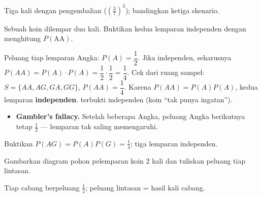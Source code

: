 \begin{variasi}
Tiga kali dengan pengembalian ($(\frac37)^3$); bandingkan ketiga skenario.
\end{variasi}

\begin{soalbox}{}
Sebuah koin dilempar dua kali. Buktikan kedua lemparan independen dengan
menghitung $P(\text{AA})$.
\end{soalbox}

\jawab
{} Peluang tiap lemparan Angka: $P(A)=\dfrac12$.
 Jika independen, seharusnya $P(AA)=P(A)\cdot P(A)=\dfrac12\cdot
\dfrac12=\dfrac14$.
 Cek dari ruang sampel: $S=\{AA,AG,GA,GG\}$, $P(AA)=\dfrac14$.
 Karena $P(AA)=P(A)P(A)$, kedua lemparan \textbf{independen}.
\jadi terbukti independen (koin ``tak punya ingatan'').

\begin{jebakan}
\begin{itemize}[leftmargin=*,topsep=2pt]
  \item \textbf{Gambler's fallacy.} Setelah beberapa Angka, peluang Angka
  berikutnya tetap $\frac12$ --- lemparan tak saling memengaruhi.
\end{itemize}
\end{jebakan}

\begin{variasi}
Buktikan $P(AG)=P(A)P(G)=\frac14$; tiga lemparan independen.
\end{variasi}

\begin{soalbox}{}
Gambarkan diagram pohon pelemparan koin $2$ kali dan tuliskan peluang tiap
lintasan.
\end{soalbox}

\jawab
Tiap cabang berpeluang $\frac12$; peluang lintasan = hasil kali cabang.

